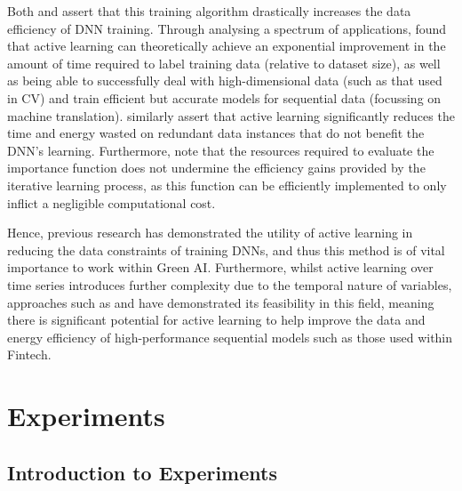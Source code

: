 \documentclass[a4paper, 11pt]{report}
\begin{document}
    Both \citet{ren-2021} and \citet{xu-2021} assert that this training algorithm drastically increases the data efficiency of DNN training. Through analysing a spectrum of applications, \citet{ren-2021} found that active learning can theoretically achieve an exponential improvement in the amount of time required to label training data (relative to dataset size), as well as being able to successfully deal with high-dimensional data (such as that used in CV) and train efficient but accurate models for sequential data (focussing on machine translation). \citet{xu-2021} similarly assert that active learning significantly reduces the time and energy wasted on redundant data instances that do not benefit the DNN's learning. Furthermore, \citet{ren-2021} note that the resources required to evaluate the importance function does not undermine the efficiency gains provided by the iterative learning process, as this function can be efficiently implemented to only inflict a negligible computational cost. 

    Hence, previous research has demonstrated the utility of active learning in reducing the data constraints of training DNNs, and thus this method is of vital importance to work within Green AI. Furthermore, whilst active learning over time series introduces further complexity due to the temporal nature of variables, approaches such as \citet{peng-2017} and \citet{zimmer-2018} have demonstrated its feasibility in this field, meaning there is significant potential for active learning to help improve the data and energy efficiency of high-performance sequential models such as those used within Fintech.


    \newpage
    \chapter{Experiments}
    \label{chapter: experiments}

    \section{Introduction to Experiments}
\end{document}
